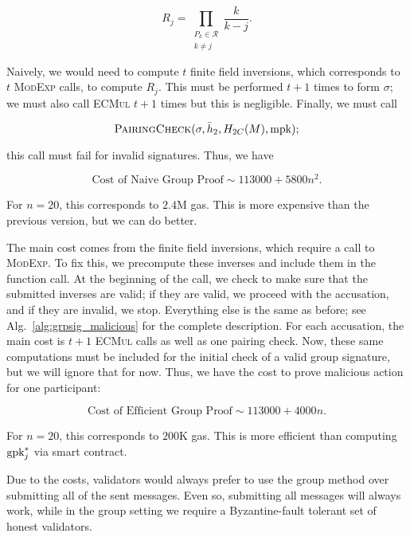 \begin{equation}
    R_{j} = \prod_{\substack{P_{k}\in\mathcal{R} \\ k\ne j}} \frac{k}{k-j}.
\end{equation}

\noindent
Naively, we would need to compute $t$ finite field inversions,
which corresponds to $t$ \textsc{ModExp} calls, to compute
$R_{j}$.
This must be performed $t+1$ times to form $\sigma$;
we must also call \textsc{ECMul} $t+1$ times but this is
negligible.
Finally, we must call

\begin{equation}
    \textsc{PairingCheck}(\sigma, \bar{h}_{2}, H_{2C}(M), \text{mpk});
\end{equation}

\noindent
this call must fail for invalid signatures.
Thus, we have

\begin{equation}
    \text{Cost of Naive Group Proof} \sim 113000 + 5800n^{2}.
\end{equation}

\noindent
For $n=20$, this corresponds to $2.4$M gas.
This is more expensive than the previous version, but we can
do better.

The main cost comes from the finite field inversions, which require
a call to \textsc{ModExp}.
To fix this, we precompute these inverses and include them
in the function call.
At the beginning of the call, we check to make sure that the submitted
inverses are valid; if they are valid, we proceed with the
accusation, and if they are invalid, we stop.
Everything else is the same as before;
see Alg.~\ref{alg:grpsig_malicious} for the complete description.
For each accusation, the main cost is $t+1$ \textsc{ECMul} calls
as well as one pairing check.
Now, these same computations must be included for the initial
check of a valid group signature, but we will ignore that for now.
Thus, we have the cost to prove malicious action for one participant:

\begin{equation}
    \text{Cost of Efficient Group Proof} \sim 113000 + 4000n.
\end{equation}

\noindent
For $n=20$, this corresponds to $200$K gas.
This is more efficient than computing $\textrm{gpk}_{j}^{*}$ via smart contract.

Due to the costs, validators would always prefer to use the group
method over submitting all of the sent messages.
Even so, submitting all messages will always work, while in the group
setting we require a Byzantine-fault tolerant set of honest
validators.



